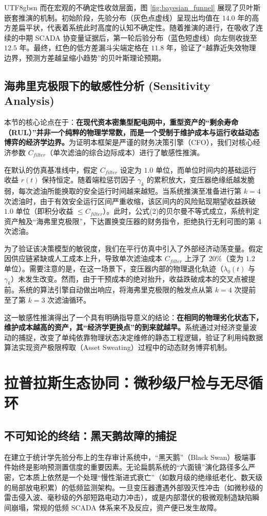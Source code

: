 \documentclass[journal]{IEEEtran}
\begin{document}
\begin{CJK*}{UTF8}{gbsn}
而在宏观的不确定性收敛层面，图 \ref{fig:bayesian_funnel} 展现了贝叶斯嵌套推演的机制。初始阶段，先验分布（灰色点虚线）呈现出均值在 $14.0$ 年的高方差扁平状，代表着系统此时高度的认知不确定性。随着推演的进行，在吸收了连续的中期 SCADA 协变量证据后，第一轮后验分布（蓝色短虚线）向左侧收拢至 $12.5$ 年。最终，红色的低方差漏斗尖端定格在 $11.8$ 年，验证了“越靠近失效物理边界，预测方差越呈缩小趋势”的贝叶斯理论预期。

\subsection{海弗里克极限下的敏感性分析 (Sensitivity Analysis)}
本节的核心论点在于：\textbf{在现代资本密集型配电网中，重型资产的“剩余寿命（RUL）”并非一个纯粹的物理学常数，而是一个受制于维护成本与运行收益动态博弈的经济学边界。}为证明本框架是严谨的财务决策引擎（CFO），我们对核心经济参数 $C_{filter}$（单次滤油的综合边际成本）进行了敏感性推演。

在默认的仿真基准线中，假定 $C_{filter}$ 设定为 $1.0$ 单位，而单位时间内的基础运行收益 $r(t)$ 保持恒定。随着端粒惩罚因子 $\gamma_k$ 的累积放大，变压器绝缘纸越发脆弱，每次滤油所能换取的安全运行时间越来越短。当系统推演至准备进行第 $k=4$ 次滤油时，由于有效安全运行区间严重收缩，该区间内的风险贴现期望收益跌破 $1.0$ 单位（即积分收益 $\leq C_{filter}$）。此时，公式(2)的贝尔曼不等式成立，系统判定资产触及“海弗里克极限”，下达置换变压器的财务指令，拒绝执行无利可图的第 4 次滤油。

为了验证该决策模型的敏锐度，我们在平行仿真中引入了外部经济动荡变量。假定因供应链紧缺或人工成本上升，导致单次滤油成本 $C_{filter}$ 上浮了 20\%（变为 $1.2$ 单位）。需要注意的是，在这一场景下，变压器内部的物理退化轨迹（$\lambda_0(t)$ 与 $\gamma_k$）未发生改变。然而，由于干预成本的绝对抬升，收益跌破成本的交叉点被提前。系统的算法引擎自动做出响应，将海弗里克极限的触发点从第 $k=4$ 次提前至了第 $k=3$ 次滤油循环。

这一敏感性推演得出了一个具有明确指导意义的结论：\textbf{在相同的物理劣化状态下，维护成本越高的资产，其“经济学更换点”的到来就越早。}系统通过对经济变量波动的捕捉，改变了单纯依靠物理状态决定维修的静态工程逻辑，验证了利用纯数据算法实现资产极限榨取（Asset Sweating）过程中的动态财务博弈机制。

\section{拉普拉斯生态协同：微秒级尸检与无尽循环}
\subsection{不可知论的终结：黑天鹅故障的捕捉}
在建立于统计学先验分布上的生存审计系统中，“黑天鹅”（Black Swan）极端事件\cite{TODO_CITE_BLACK_SWAN}始终是影响预测置信度的重要因素。无论扁鹊系统的“六面镜”演化路径多么严密，它本质上依然是一个处理“慢性渐进式衰亡”（如数月级的绝缘纸老化、数天级的局部放电积累）的低频监测架构。一旦变压器遭遇外部毁灭性冲击（如微秒级的雷击侵入波、毫秒级的外部短路电动力冲击），或是内部潜伏的极微观制造缺陷瞬间崩塌，常规的低频 SCADA 体系来不及反应，资产便已发生故障。


\end{CJK*}
\end{document}
